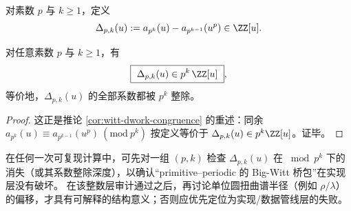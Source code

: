 \begin{definition}\label{def:witt-frobenius-defect}
对素数 \(p\) 与 \(k\ge 1\)，定义
\[
\Delta_{p,k}(u):=a_{p^k}(u)-a_{p^{k-1}}(u^p)\in\ZZ[u].
\]
\end{definition}

\begin{proposition}\label{prop:witt-frobenius-defect-divisibility}
对任意素数 \(p\) 与 \(k\ge 1\)，有
\[
\boxed{\ \Delta_{p,k}(u)\in p^k\,\ZZ[u]\ },
\]
等价地，\(\Delta_{p,k}(u)\) 的全部系数都被 \(p^k\) 整除。
\end{proposition}
\begin{proof}
这正是推论 \ref{cor:witt-dwork-congruence} 的重述：同余
\(
a_{p^k}(u)\equiv a_{p^{k-1}}(u^p)\ (\mathrm{mod}\ p^k)
\)
按定义等价于 \(\Delta_{p,k}(u)\in p^k\ZZ[u]\)。证毕。
\end{proof}

\begin{remark}[整数层审计与谱层指标的分层]\label{rem:witt-frobenius-defect-audit}
在任何一次可复现计算中，可先对一组 \((p,k)\) 检查 \(\Delta_{p,k}(u)\) 在 \(\bmod p^k\) 下的消失（或其系数整除深度），以确认“primitive--periodic 的 Big-Witt 桥包”在实现层没有破坏。
在该整数层审计通过之后，再讨论单位圆扭曲谱半径（例如 \(\rho/\lambda\)）的偏移，才具有可解释的结构意义；否则应优先定位为实现/数据管线层的失败。
\end{remark}
